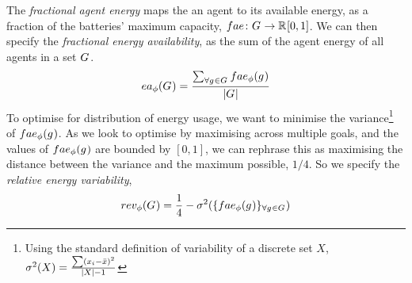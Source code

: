 \newcommand{\functionEnergyAvailable}[2]{
	\ifx \\#1\\
	\functionSignature{ea_{\varTime{}{}}}{\setAgents{}{}}
	\else
	\functionSignature{ea_{\varTime{}{}}}{#1}
	\fi
}
The \textit{fractional agent energy} maps the an agent to its available energy, as a fraction of the batteries' maximum capacity, $\formalAgentEnergyAvailable{}{}$. We can then specify the \textit{fractional energy availability}, as the sum of the agent energy of all agents in a set $G_{}^{}$.
\begin{equation}
	\functionEnergyAvailable{}{} 
	= \dfrac{\sum_{\forall \varAgent{}{} \in \setAgents{}{}} \functionAgentEnergyAvailable{\varAgent{i}{}}{}}
	{\funcSize{\setAgents{}{}}}
\end{equation}
To optimise for distribution of energy usage, we want to minimise the variance\footnote{Using the standard definition of variability of a discrete set $X$, $\sigma^2(X) = \frac{\sum (x_i - \bar{x})^2}{\lvert X \rvert-1}$} of $\functionAgentEnergyAvailable{}{}$. As we look to optimise by maximising across multiple goals, and the values of $\functionAgentEnergyAvailable{}{}$ are bounded by $[0, 1]$, we can rephrase this as maximising the distance between the variance and the maximum possible, $1/4$. So we specify the \textit{relative energy variability},
\begin{equation}     	
	\functionEnergyVariability{}{} 
	= \frac{1}{4} - \sigma^2(
	\lbrace \functionAgentEnergyAvailable{}{}
	\rbrace_{\forall \varAgent{}{} \in \setAgents{}{}}
	)
\end{equation}


